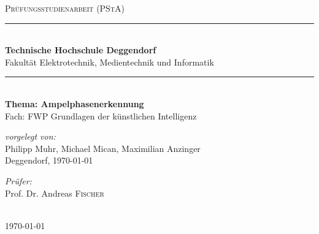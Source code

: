 
\begin{titlepage}
	\begin{center}
		
		\textsc{\scshape \huge Prüfungsstudienarbeit (PStA)}\\
		\rule{1\textwidth}{1mm} \\[0.5cm]
		{ \LARGE  {\bfseries Technische Hochschule Deggendorf}}\\[0.5cm]
		{ \LARGE   Fakultät Elektrotechnik, Medientechnik und Informatik}\\[0.5cm]
		\rule{1\textwidth}{1mm} \\[4cm] 
		{ \Large \bfseries Thema: Ampelphasenerkennung}\\[2cm]
		{ Fach: FWP Grundlagen der künstlichen Intelligenz}\\[5cm]
		
		\begin{minipage}{0.4\textwidth}
			\begin{flushleft} \normalsize
				\emph{vorgelegt von:}\\[0.3cm]
				Philipp Muhr, Michael Mican, Maximilian Anzinger\\[0.2cm]
				Deggendorf,  \today
			\end{flushleft}
		\end{minipage}
		\begin{minipage}{0.5\textwidth}
			\begin{flushright} \normalsize
				\emph{Prüfer:}\\[0.3cm]
				Prof. Dr. Andreas \textsc{Fischer}\\[0.2cm]
			\end{flushright}
		\end{minipage}\\[2cm]
		{\large \today}
				
	\end{center}
\end{titlepage}
